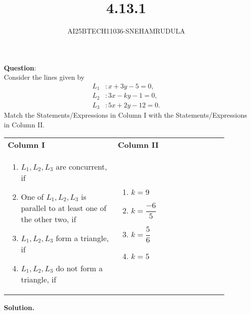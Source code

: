 \documentclass[journal]{IEEEtran}
\begin{document}

\vspace{3cm}

\title{4.13.1}
\author{AI25BTECH11036-SNEHAMRUDULA}
 \maketitle
{\let\newpage\relax\maketitle}
\renewcommand{\thefigure}{\theenumi}
\renewcommand{\thetable}{\theenumi}
\setlength{\intextsep}{10pt} 
\renewcommand{\thetable}{\theenumi}
\textbf{Question}:\\

Consider the lines given by
\begin{align*}
L_1 &: x + 3y - 5 = 0, \\
L_2 &: 3x - ky - 1 = 0, \\
L_3 &: 5x + 2y - 12 = 0.
\end{align*}
Match the Statements/Expressions in Column I with the Statements/Expressions in Column II.

\begin{center}
\begin{tabular}{p{0.45\linewidth} p{0.45\linewidth}}
\textbf{Column I} & \textbf{Column II} \\
\begin{enumerate}[label=(\Alph*)]
    \item $L_1, L_2, L_3$ are concurrent, if
    \item One of $L_1, L_2, L_3$ is parallel to at least one of the other two, if
    \item $L_1, L_2, L_3$ form a triangle, if
    \item $L_1, L_2, L_3$ do not form a triangle, if
\end{enumerate}
&
\begin{enumerate}[label=(\alph*)]
    \item $k = 9$
    \item $k = \dfrac{-6}{5}$
    \item $k = \dfrac{5}{6}$
    \item $k = 5$
\end{enumerate}
\end{tabular}
\end{center}
\textbf{Solution.}

\medskip
\end{document}
